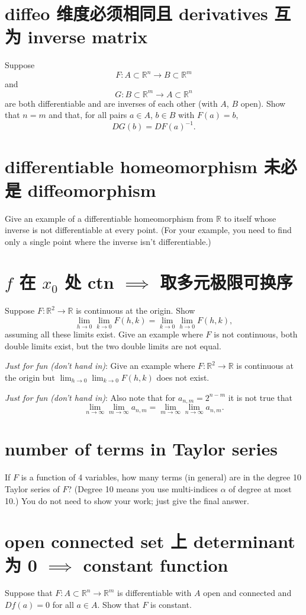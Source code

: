 \documentclass[lang=cn,11pt]{template}
\begin{document}
\section{diffeo 维度必须相同且 derivatives 互为 inverse matrix}
Suppose
\[
F : A \subset \mathbb{R}^n \to B \subset \mathbb{R}^m
\]
and
\[
G : B \subset \mathbb{R}^m \to A \subset \mathbb{R}^n
\]
are both differentiable and are inverses of each other (with $A$, $B$ open). Show that $n = m$ and that, for all pairs $a \in A$, $b \in B$ with $F(a) = b$,
\[
DG(b) = DF(a)^{-1}.
\]

\section{differentiable homeomorphism 未必是 diffeomorphism}
Give an example of a differentiable homeomorphism from $\mathbb{R}$ to itself whose inverse is not differentiable at every point. (For your example, you need to find only a single point where the inverse isn’t differentiable.)

\section{$f$ 在 $x_0$ 处 ctn $\implies$ 取多元极限可换序}
Suppose $F : \mathbb{R}^2 \to \mathbb{R}$ is continuous at the origin. Show
\[
\lim_{h \to 0} \lim_{k \to 0} F(h, k) = \lim_{k \to 0} \lim_{h \to 0} F(h, k),
\]
assuming all these limits exist. Give an example where $F$ is not continuous, both double limits exist, but the two double limits are not equal.

\textit{Just for fun (don’t hand in)}: Give an example where $F : \mathbb{R}^2 \to \mathbb{R}$ is continuous at the origin but $\lim_{h \to 0} \lim_{k \to 0} F(h, k)$ does not exist.

\textit{Just for fun (don’t hand in)}: Also note that for $a_{n,m} = 2^{n-m}$ it is not true that
\[
\lim_{n \to \infty} \lim_{m \to \infty} a_{n,m} = \lim_{m \to \infty} \lim_{n \to \infty} a_{n,m}.
\]

\section{number of terms in Taylor series}
If $F$ is a function of 4 variables, how many terms (in general) are in the degree 10 Taylor series of $F$? (Degree 10 means you use multi-indices $\alpha$ of degree at most 10.) You do not need to show your work; just give the final answer.

\section{open connected set 上 determinant 为 0 $\implies$ constant function}
Suppose that $F : A \subset \mathbb{R}^n \to \mathbb{R}^m$ is differentiable with $A$ open and connected and $Df(a) = 0$ for all $a \in A$. Show that $F$ is constant.
\end{document}
